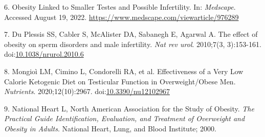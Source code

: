 \documentclass[11pt]{article}
\begin{document}
\hypertarget{citeproc_bib_item_6}{6. Obesity Linked to Smaller Testes and Possible Infertility. In: \textit{Medscape}. Accessed August 19, 2022. \url{https://www.medscape.com/viewarticle/976289}}

\hypertarget{citeproc_bib_item_7}{7. Du Plessis SS, Cabler S, McAlister DA, Sabanegh E, Agarwal A. The effect of obesity on sperm disorders and male infertility. \textit{Nat rev urol}. 2010;7(3, 3):153-161. doi:\href{https://doi.org/10.1038/nrurol.2010.6}{10.1038/nrurol.2010.6}}

\hypertarget{citeproc_bib_item_8}{8. Mongioì LM, Cimino L, Condorelli RA, et al. Effectiveness of a Very Low Calorie Ketogenic Diet on Testicular Function in Overweight/Obese Men. \textit{Nutrients}. 2020;12(10):2967. doi:\href{https://doi.org/10.3390/nu12102967}{10.3390/nu12102967}}

\hypertarget{citeproc_bib_item_9}{9. National Heart L, North American Association for the Study of Obesity. \textit{The Practical Guide Identification, Evaluation, and Treatment of Overweight and Obesity in Adults}. National Heart, Lung, and Blood Institute; 2000.}
\end{document}
